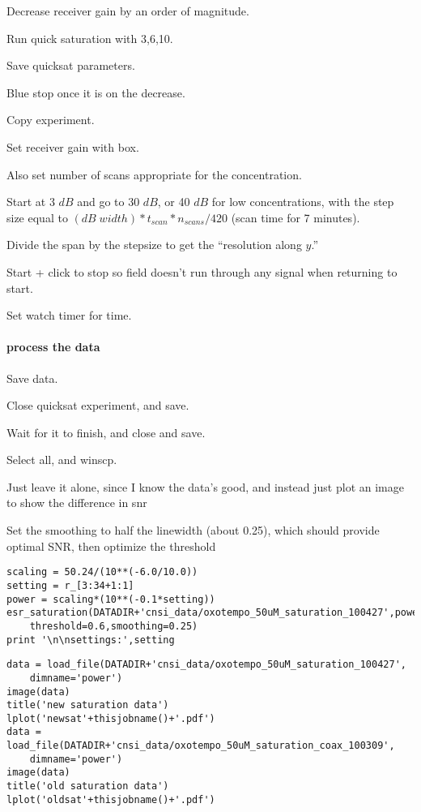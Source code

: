 Decrease receiver gain by an order of magnitude.

Run quick saturation with 3,6,10.

Save quicksat parameters.

Blue stop once it is on the decrease.

Copy experiment.

Set receiver gain with box.

Also set number of scans appropriate for the concentration.

Start at 3 $dB$ and go to 30 $dB$, or 40 $dB$ for low concentrations, with the step size equal to $(dB\;width)*t_{scan}*n_{scans}/420$ (scan time for 7 minutes).

Divide the span by the stepsize to get the ``resolution along $y$.''

Start + click to stop so field doesn't run through any signal when returning to start.

Set watch timer for time.

\paragraph{process the data}
Save data.

Close quicksat experiment, and save.

Wait for it to finish, and close and save.

Select all, and winscp.

Just leave it alone, since I know the data's good, and instead just plot an image to show the difference in snr

Set the smoothing to half the linewidth (about 0.25), which should provide optimal SNR, then optimize the threshold


\begin{tiny}
\begin{lstlisting}
scaling = 50.24/(10**(-6.0/10.0))
setting = r_[3:34+1:1]
power = scaling*(10**(-0.1*setting))
esr_saturation(DATADIR+'cnsi_data/oxotempo_50uM_saturation_100427',power,
    threshold=0.6,smoothing=0.25)
print '\n\nsettings:',setting
\end{lstlisting}


\begin{lstlisting}
data = load_file(DATADIR+'cnsi_data/oxotempo_50uM_saturation_100427',
    dimname='power')
image(data)
title('new saturation data')
lplot('newsat'+thisjobname()+'.pdf')
data = load_file(DATADIR+'cnsi_data/oxotempo_50uM_saturation_coax_100309',
    dimname='power')
image(data)
title('old saturation data')
lplot('oldsat'+thisjobname()+'.pdf')
\end{lstlisting}
\end{tiny}


